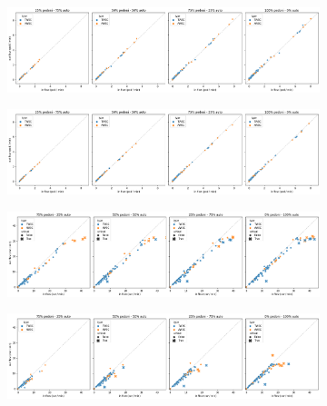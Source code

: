 \begin{figure}
    \centering
    \begin{subfigure}{0.99\textwidth}
        \centering
        \includegraphics[width=\textwidth]{images/analisi/comparison-base-in-out-flow-ped.png}
        \caption{}
    \end{subfigure}
    \begin{subfigure}{0.99\textwidth}
        \centering
        \includegraphics[width=\textwidth]{images/analisi/comparison-new-in-out-flow-ped.png}
        \caption{}
    \end{subfigure}
    \caption{}
    \label{fig:analisi-comparison-in-out-flow-ped}
\end{figure}

\begin{figure}
    \centering
    \begin{subfigure}{0.99\textwidth}
        \centering
        \includegraphics[width=\textwidth]{images/analisi/comparison-base-in-out-flow-car.png}
        \caption{}
    \end{subfigure}
    \begin{subfigure}{0.99\textwidth}
        \centering
        \includegraphics[width=\textwidth]{images/analisi/comparison-new-in-out-flow-car.png}
        \caption{}
    \end{subfigure}
    \caption{}
    \label{fig:analisi-comparison-in-out-flow-car}
\end{figure}

